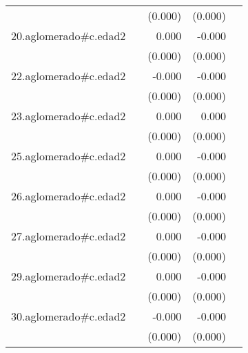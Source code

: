 {\begin{longtable}{l*{4}{D{.}{.}{-1}}}
            &                     &     (0.000)         &     (0.000)         &                     \\
\addlinespace
20.aglomerado#c.edad2&                     &       0.000         &      -0.000         &                     \\
            &                     &     (0.000)         &     (0.000)         &                     \\
\addlinespace
22.aglomerado#c.edad2&                     &      -0.000         &      -0.000\sym{***}&                     \\
            &                     &     (0.000)         &     (0.000)         &                     \\
\addlinespace
23.aglomerado#c.edad2&                     &       0.000\sym{**} &       0.000         &                     \\
            &                     &     (0.000)         &     (0.000)         &                     \\
\addlinespace
25.aglomerado#c.edad2&                     &       0.000         &      -0.000         &                     \\
            &                     &     (0.000)         &     (0.000)         &                     \\
\addlinespace
26.aglomerado#c.edad2&                     &       0.000         &      -0.000         &                     \\
            &                     &     (0.000)         &     (0.000)         &                     \\
\addlinespace
27.aglomerado#c.edad2&                     &       0.000         &      -0.000\sym{**} &                     \\
            &                     &     (0.000)         &     (0.000)         &                     \\
\addlinespace
29.aglomerado#c.edad2&                     &       0.000         &      -0.000\sym{*}  &                     \\
            &                     &     (0.000)         &     (0.000)         &                     \\
\addlinespace
30.aglomerado#c.edad2&                     &      -0.000         &      -0.000\sym{**} &                     \\
            &                     &     (0.000)         &     (0.000)         &                     \\

\end{longtable}}

